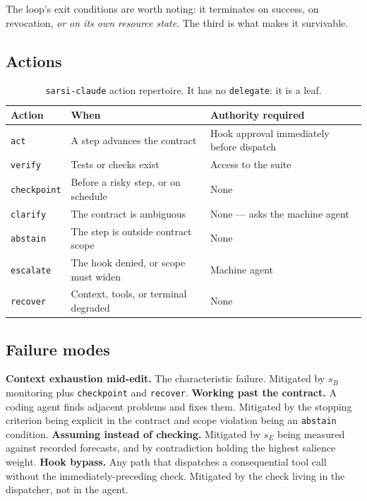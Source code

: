 \documentclass[11pt]{article}
\newcommand{\code}[1]{\texttt{\small #1}}
\begin{document}
The loop's exit conditions are worth noting: it terminates on success, on revocation, \emph{or on its own resource state}. The third is what makes it survivable.

\subsection{Actions}

\begin{table}[h]
\centering\small
\caption{\code{sarsi-claude} action repertoire. It has no \code{delegate}: it is a leaf.}
\label{tab:cld-actions}
\begin{tabular}{@{}L{2.1cm}L{5.7cm}L{5.4cm}@{}}
\toprule
\textbf{Action} & \textbf{When} & \textbf{Authority required} \\
\midrule
\code{act} & A step advances the contract & Hook approval immediately before dispatch \\
\code{verify} & Tests or checks exist & Access to the suite \\
\code{checkpoint} & Before a risky step, or on schedule & None \\
\code{clarify} & The contract is ambiguous & None --- asks the machine agent \\
\code{abstain} & The step is outside contract scope & None \\
\code{escalate} & The hook denied, or scope must widen & Machine agent \\
\code{recover} & Context, tools, or terminal degraded & None \\
\bottomrule
\end{tabular}
\end{table}

\subsection{Failure modes}

\textbf{Context exhaustion mid-edit.} The characteristic failure. Mitigated by $s_B$ monitoring plus \code{checkpoint} and \code{recover}.
\textbf{Working past the contract.} A coding agent finds adjacent problems and fixes them. Mitigated by the stopping criterion being explicit in the contract and scope violation being an \code{abstain} condition.
\textbf{Assuming instead of checking.} Mitigated by $s_E$ being measured against recorded forecasts, and by contradiction holding the highest salience weight.
\textbf{Hook bypass.} Any path that dispatches a consequential tool call without the immediately-preceding check. Mitigated by the check living in the dispatcher, not in the agent.
\end{document}
